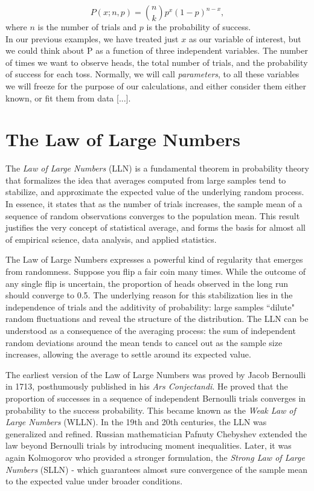 \documentclass{book}
\begin{document}
\begin{equation}
    P(x; n, p) = \binom{n}{k} p^x (1-p)^{n-x},
\end{equation}
where $n$ is the number of trials and $p$ is the probability of success.\\

In our previous examples, we have treated just $x$ as our variable of interest, but we could think about P as a function of three independent variables. The number of times we want to observe heads, the total number of trials, and the probability of success for each toss. Normally, we will call \textit{parameters}, to all these variables we will freeze for the purpose of our calculations, and either consider them either known, or fit them from data [...].
 
 \newpage 
 
\section{The Law of Large Numbers}

The \textit{Law of Large Numbers} (LLN) is a fundamental theorem in probability theory that formalizes the idea that averages computed from large samples tend to stabilize, and approximate the expected value of the underlying random process. In essence, it states that as the number of trials increases, the sample mean of a sequence of random observations converges to the population mean. This result justifies the very concept of statistical average, and forms the basis for almost all of empirical science, data analysis, and applied statistics.

\medskip

The Law of Large Numbers expresses a powerful kind of regularity that emerges from randomness. Suppose you flip a fair coin many times. While the outcome of any single flip is uncertain, the proportion of heads observed in the long run should converge to 0.5. The underlying reason for this stabilization lies in the independence of trials and the additivity of probability: large samples ``dilute" random fluctuations and reveal the structure of the distribution. The LLN can be understood as a consequence of the averaging process: the sum of independent random deviations around the mean tends to cancel out as the sample size increases, allowing the average to settle around its expected value.

\medskip

The earliest version of the Law of Large Numbers was proved by {Jacob Bernoulli} in 1713, posthumously published in his \textit{Ars Conjectandi}. He proved that the proportion of successes in a sequence of independent Bernoulli trials converges in probability to the success probability. This became known as the \textit{Weak Law of Large Numbers} (WLLN). In the 19th and 20th centuries, the LLN was generalized and refined. Russian mathematician Pafnuty Chebyshev extended the law beyond Bernoulli trials by introducing moment inequalities. Later, it was again Kolmogorov who provided a stronger formulation, the \textit{Strong Law of Large Numbers} (SLLN) - which guarantees almost sure convergence of the sample mean to the expected value under broader conditions.
\end{document}
